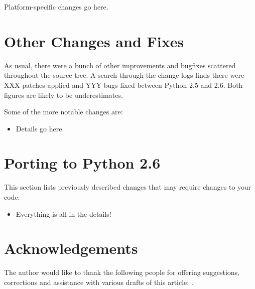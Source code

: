 \documentclass{howto}
\begin{document}
Platform-specific changes go here.


\section{Other Changes and Fixes \label{section-other}}

As usual, there were a bunch of other improvements and bugfixes
scattered throughout the source tree.  A search through the change
logs finds there were XXX patches applied and YYY bugs fixed between
Python 2.5 and 2.6.  Both figures are likely to be underestimates.

Some of the more notable changes are:

\begin{itemize}

\item Details go here.

\end{itemize}


\section{Porting to Python 2.6}

This section lists previously described changes that may require
changes to your code:

\begin{itemize}

\item Everything is all in the details!

\end{itemize}


\section{Acknowledgements \label{acks}}

The author would like to thank the following people for offering
suggestions, corrections and assistance with various drafts of this
article: .
\end{document}
